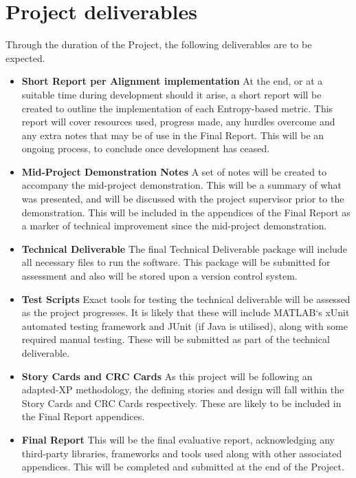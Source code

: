 \documentclass[11pt,fleqn,twoside]{article}
\begin{document}
\section{Project deliverables}
Through the duration of the Project, the following deliverables are to be expected.

\begin{itemize}
\item \textbf{Short Report per Alignment implementation} At the end, or at a suitable time during development should it arise, a short report will be created to outline the implementation of each Entropy-based metric. This report will cover resources used, progress made, any hurdles overcome and any extra notes that may be of use in the Final Report. This will be an ongoing process,  to conclude once development has ceased.
\item \textbf{Mid-Project Demonstration Notes} A set of notes will be created to accompany the mid-project demonstration. This will be a summary of what was presented, and will be discussed with the project supervisor prior to the demonstration. This will be included in the appendices of the Final Report as a marker of technical improvement since the mid-project demonstration.

\item \textbf{Technical Deliverable} The final Technical Deliverable package will include all necessary files to run the software. This package will be submitted for assessment and also will be stored upon a version control system.

\item \textbf{Test Scripts} Exact tools for testing the technical deliverable will be assessed as the project progresses. It is likely that these will include MATLAB`s xUnit automated testing framework and JUnit (if Java is utilised), along with some required manual testing. These will be submitted as part of the technical deliverable.

\item \textbf{Story Cards and CRC Cards} As this project will be following an adapted-XP methodology, the defining stories and design will fall within the Story Cards and CRC Cards respectively. These are likely to be included in the Final Report appendices.

\item \textbf{Final Report} This will be the final evaluative report, acknowledging any third-party libraries, frameworks and tools used along with other associated appendices. This will be completed and submitted at the end of the Project.


\end{itemize}
\end{document}
